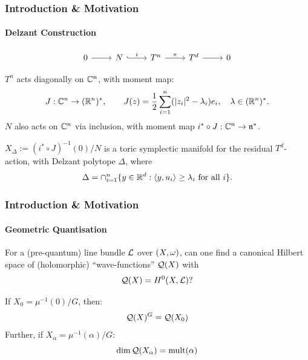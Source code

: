 \begin{frame}
	\frametitle{Introduction \& Motivation}
	\framesubtitle{Delzant Construction}
	
	\begin{equation*}
	\begin{tikzcd}[ampersand replacement=\&]
	0 \arrow[r] \& N \arrow[r, "i",hook] \& T^{n} \arrow[r, "\pi"] \& T^{d} \arrow[r] \& 0
	\end{tikzcd}
	\end{equation*}
	
	$T^{n}$ acts diagonally on $\mathbb{C}^{n}$, with moment map:
	$$
		J:\mathbb{C}^{n} \rightarrow (\mathbb{R}^{n})^{\ast},\qquad J(z) = \frac{1}{2}\sum_{i=1}^{n}(|z_{i}|^{2} - \lambda_{i})e_{i},\quad \lambda\in (\mathbb{R}^{n})^{\ast}.
	$$
	$N$ also acts on $\mathbb{C}^{n}$ via inclusion, with moment map $i^{\ast}\circ J: \mathbb{C}^{n} \rightarrow \mathfrak{n}^{\ast}$.
	
	
	\begin{fact}
		$X_{\Delta} := (i^{\ast}\circ J)^{-1}(0) / N$ is a toric symplectic manifold for the residual $T^{d}$-action, with Delzant polytope $\Delta$, where $$\Delta = \cap_{i=1}^{n} \{y \in \mathbb{R}^{d} : \langle y, u_{i} \rangle \geq \lambda_{i} \text{ for all } i  \}.$$
	\end{fact}
	
\end{frame}


\begin{frame}
\frametitle{Introduction \& Motivation}
\framesubtitle{Geometric Quantisation}

\begin{qstn}
	For a (pre-quantum) line bundle $\mathcal{L}$ over $(X,\omega)$, can one find a canonical Hilbert space of (holomorphic) ``wave-functions'' $\mathcal{Q}(X)$ with 
	$$
		\mathcal{Q}(X) = H^{0}(X,\mathcal{L})?
	$$
\end{qstn}

\begin{conj}
	If $X_{0} = \mu^{-1}(0)/G$, then:
	$$
		\mathcal{Q}(X)^{G} = \mathcal{Q}(X_{0})
	$$
	Further, if $X_{\alpha} = \mu^{-1}(\alpha)/G$:
	$$
		\dim \mathcal{Q}(X_{\alpha}) = \operatorname{mult}(\alpha)
	$$
\end{conj}

\end{frame}



